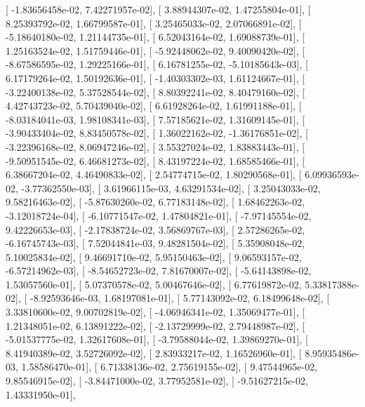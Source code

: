\documentclass{article}
\begin{document}
       [ -1.83656458e-02,   7.42271957e-02],
       [  3.88944307e-02,   1.47255804e-01],
       [  8.25393792e-02,   1.66799587e-01],
       [  3.25465033e-02,   2.07066891e-02],
       [ -5.18640180e-02,   1.21144735e-01],
       [  6.52043164e-02,   1.69088739e-01],
       [  1.25163524e-02,   1.51759446e-01],
       [ -5.92448062e-02,   9.40090420e-02],
       [ -8.67586595e-02,   1.29225166e-01],
       [  6.16781255e-02,  -5.10185643e-03],
       [  6.17179264e-02,   1.50192636e-01],
       [ -1.40303302e-03,   1.61124667e-01],
       [ -3.22400138e-02,   5.37528544e-02],
       [  8.80392241e-02,   8.40479160e-02],
       [  4.42743723e-02,   5.70439040e-02],
       [  6.61928264e-02,   1.61991188e-01],
       [ -8.03184041e-03,   1.98108341e-03],
       [  7.57185621e-02,   1.31609145e-01],
       [ -3.90433404e-02,   8.83450578e-02],
       [  1.36022162e-02,  -1.36176851e-02],
       [ -3.22396168e-02,   8.06947246e-02],
       [  3.55327024e-02,   1.83883443e-01],
       [ -9.50951545e-02,   6.46681273e-02],
       [  8.43197224e-02,   1.68585466e-01],
       [  6.38667204e-02,   4.46490833e-02],
       [  2.54774715e-02,   1.80290568e-01],
       [  6.09936593e-02,  -3.77362550e-03],
       [  3.61966115e-03,   4.63291534e-02],
       [  3.25043033e-02,   9.58216463e-02],
       [ -5.87630260e-02,   6.77183148e-02],
       [  1.68462263e-02,  -3.12018724e-04],
       [ -6.10771547e-02,   1.47804821e-01],
       [ -7.97145554e-02,   9.42226653e-03],
       [ -2.17838724e-02,   3.56869767e-03],
       [  2.57286265e-02,  -6.16745743e-03],
       [  7.52044841e-03,   9.48281504e-02],
       [  5.35908048e-02,   5.10025834e-02],
       [  9.46691710e-02,   5.95150463e-02],
       [  9.06593157e-02,  -6.57214962e-03],
       [ -8.54652723e-02,   7.81670007e-02],
       [ -5.64143898e-02,   1.53057560e-01],
       [  5.07370578e-02,   5.00467646e-02],
       [  6.77619872e-02,   5.33817388e-02],
       [ -8.92593646e-03,   1.68197081e-01],
       [  5.77143092e-02,   6.18499648e-02],
       [  3.33810600e-02,   9.00702819e-02],
       [ -4.06946341e-02,   1.35069477e-01],
       [  1.21348051e-02,   6.13891222e-02],
       [ -2.13729999e-02,   2.79448987e-02],
       [ -5.01537775e-02,   1.32617608e-01],
       [ -3.79588044e-02,   1.39869270e-01],
       [  8.41940389e-02,   3.52726092e-02],
       [  2.83933217e-02,   1.16526960e-01],
       [  8.95935486e-03,   1.58586470e-01],
       [  6.71338136e-02,   2.75619155e-02],
       [  9.47544965e-02,   9.85546915e-02],
       [ -3.84471000e-02,   3.77952581e-02],
       [ -9.51627215e-02,   1.43331950e-01],
\end{document}

